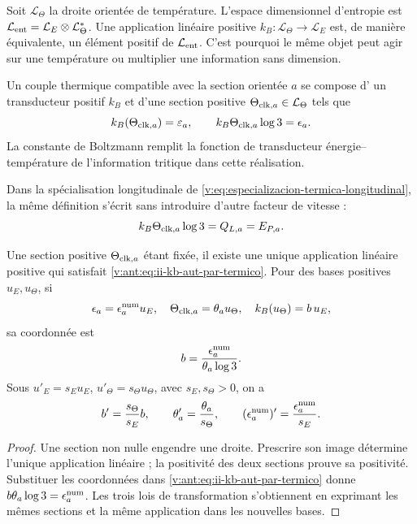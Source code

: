 Soit \(\mathcal L_\Theta\) la droite orientée de température. L'espace dimensionnel d'entropie est \(\mathcal L_{\rm ent}=\mathcal L_E\otimes\mathcal L_\Theta^*\). Une application linéaire positive \(k_B:\mathcal L_\Theta\to\mathcal L_E\) est, de manière équivalente, un élément positif de \(\mathcal L_{\rm ent}\). C'est pourquoi le même objet peut agir sur une température ou multiplier une information sans dimension.

\begin{definition}
Un couple thermique compatible avec la section orientée \(a\) se compose d'
un transducteur positif \(k_B\) et d'une section positive
\(\Theta_{{\rm clk},a}\in\mathcal L_\Theta\) tels que
\begin{equation}
 k_B(\Theta_{{\rm clk},a})=\varepsilon_a,
 \qquad
 k_B\Theta_{{\rm clk},a}\log3=\epsilon_a.
 \label{v:ant:eq:ii-kb-aut-par-termico}
\end{equation}
La constante de Boltzmann remplit la fonction de transducteur
énergie--température de l'information tritique dans cette réalisation.
\end{definition}

Dans la spécialisation longitudinale de
\eqref{v:eq:especializacion-termica-longitudinal}, la même définition
s’écrit sans introduire d’autre facteur de vitesse :
\begin{equation}
 k_B\Theta_{{\rm clk},a}\log3=Q_{L,a}=E_{P,a}.
 \label{v:eq:transduccion-termica-longitudinal}
\end{equation}

\begin{theorem}
Une section positive \(\Theta_{{\rm clk},a}\) étant fixée, il existe une unique application linéaire positive qui satisfait \eqref{v:ant:eq:ii-kb-aut-par-termico}. Pour des bases positives \(u_E,u_\Theta\), si
\[
 \epsilon_a=\epsilon_a^{\rm num}u_E,\quad
 \Theta_{{\rm clk},a}=\theta_a u_\Theta,\quad
 k_B(u_\Theta)=b\,u_E,
\]
sa coordonnée est
\begin{equation}
 b=\frac{\epsilon_a^{\rm num}}{\theta_a\log3}.
 \label{v:ant:eq:ii-kb-aut-coordenada}
\end{equation}
Sous \(u'_E=s_Eu_E\), \(u'_\Theta=s_\Theta u_\Theta\), avec
\(s_E,s_\Theta>0\), on a
\[
 b'=\frac{s_\Theta}{s_E}b,\qquad
 \theta'_a=\frac{\theta_a}{s_\Theta},\qquad
 (\epsilon_a^{\rm num})'=\frac{\epsilon_a^{\rm num}}{s_E}.
\]
\end{theorem}
\begin{proof}
Une section non nulle engendre une droite. Prescrire son image détermine
l'unique application linéaire ; la positivité des deux sections prouve
sa positivité. Substituer les coordonnées dans
\eqref{v:ant:eq:ii-kb-aut-par-termico} donne
\(b\theta_a\log3=\epsilon_a^{\rm num}\). Les trois lois de
transformation s'obtiennent en exprimant les mêmes sections et la même
application dans les nouvelles bases.
\end{proof}

